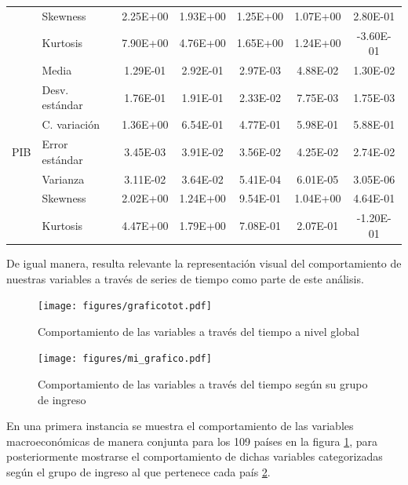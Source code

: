 \documentclass[conference]{IEEEtran}
\begin{document}
\begin{table}[H]
\begin{tabular}{|c|l|c|c|c|c|c|}
                     & Skewness       & 2.25E+00  & 1.93E+00  & 1.25E+00  & 1.07E+00 & 2.80E-01  \\ \cline{2-7} 
                     & Kurtosis       & 7.90E+00  & 4.76E+00  & 1.65E+00  & 1.24E+00 & -3.60E-01 \\ \hline
\multirow{7}{*}{PIB} & Media          & 1.29E-01  & 2.92E-01  & 2.97E-03  & 4.88E-02 & 1.30E-02  \\ \cline{2-7} 
                     & Desv. estándar & 1.76E-01  & 1.91E-01  & 2.33E-02  & 7.75E-03 & 1.75E-03  \\ \cline{2-7} 
                     & C. variación   & 1.36E+00  & 6.54E-01  & 4.77E-01  & 5.98E-01 & 5.88E-01  \\ \cline{2-7} 
                     & Error estándar & 3.45E-03  & 3.91E-02  & 3.56E-02  & 4.25E-02 & 2.74E-02  \\ \cline{2-7} 
                     & Varianza       & 3.11E-02  & 3.64E-02  & 5.41E-04  & 6.01E-05 & 3.05E-06  \\ \cline{2-7} 
                     & Skewness       & 2.02E+00  & 1.24E+00  & 9.54E-01  & 1.04E+00 & 4.64E-01  \\ \cline{2-7} 
                     & Kurtosis       & 4.47E+00  & 1.79E+00  & 7.08E-01  & 2.07E-01 & -1.20E-01 \\ \hline
\end{tabular}

\end{table}

De igual manera, resulta relevante la representación visual del comportamiento de nuestras variables a través de series de tiempo como parte de este análisis.

\begin{figure}[H]
    \centering
    \texttt{[image: figures/graficotot.pdf]}
    \caption{Comportamiento de las variables a través del tiempo a nivel global}
    \label{fig:serietot}
\end{figure}

\begin{figure}[H]
    \centering
    \texttt{[image: figures/mi\_grafico.pdf]}
    \caption{Comportamiento de las variables a través del tiempo según su grupo de ingreso}
    \label{fig:serieing}
\end{figure}

En una primera instancia se muestra el comportamiento de las variables macroeconómicas de manera conjunta para los 109 países en la figura \ref{fig:serietot}, para posteriormente mostrarse el comportamiento de dichas variables categorizadas según el grupo de ingreso al que pertenece cada país \ref{fig:serieing}.
\end{document}
